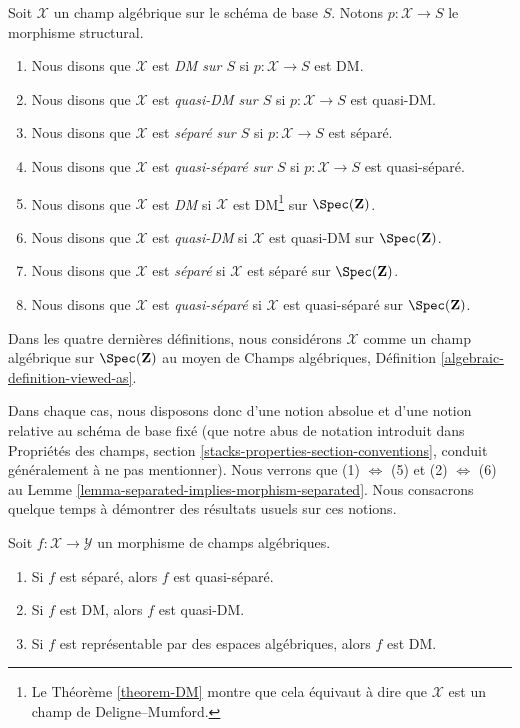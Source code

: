 \begin{definition}
\label{definition-absolute-separated}
Soit $\mathcal{X}$ un champ algébrique sur le schéma de base $S$. Notons
$p:\mathcal{X}\to S$ le morphisme structural.
\begin{enumerate}
\item Nous disons que $\mathcal{X}$ est {\it DM sur $S$} si
$p:\mathcal{X}\to S$ est DM.
\item Nous disons que $\mathcal{X}$ est {\it quasi-DM sur $S$} si
$p:\mathcal{X}\to S$ est quasi-DM.
\item Nous disons que $\mathcal{X}$ est {\it séparé sur $S$} si
$p:\mathcal{X}\to S$ est séparé.
\item Nous disons que $\mathcal{X}$ est {\it quasi-séparé sur $S$} si
$p:\mathcal{X}\to S$ est quasi-séparé.
\item Nous disons que $\mathcal{X}$ est {\it DM} si $\mathcal{X}$ est
DM\footnote{Le Théorème \ref{theorem-DM} montre que cela équivaut à dire que
$\mathcal{X}$ est un champ de Deligne--Mumford.} sur $\Spec(\mathbf{Z})$.
\item Nous disons que $\mathcal{X}$ est {\it quasi-DM} si $\mathcal{X}$ est
quasi-DM sur $\Spec(\mathbf{Z})$.
\item Nous disons que $\mathcal{X}$ est {\it séparé} si $\mathcal{X}$ est
séparé sur $\Spec(\mathbf{Z})$.
\item Nous disons que $\mathcal{X}$ est {\it quasi-séparé} si
$\mathcal{X}$ est quasi-séparé sur $\Spec(\mathbf{Z})$.
\end{enumerate}
Dans les quatre dernières définitions, nous considérons $\mathcal{X}$ comme un
champ algébrique sur $\Spec(\mathbf{Z})$ au moyen de Champs algébriques,
Définition \ref{algebraic-definition-viewed-as}.
\end{definition}

\noindent
Dans chaque cas, nous disposons donc d'une notion absolue et d'une notion
relative au schéma de base fixé (que notre abus de notation introduit dans
Propriétés des champs, section \ref{stacks-properties-section-conventions},
conduit généralement à ne pas mentionner). Nous verrons que
(1) $\Leftrightarrow$ (5) et (2) $\Leftrightarrow$ (6) au Lemme
\ref{lemma-separated-implies-morphism-separated}. Nous consacrons quelque
temps à démontrer des résultats usuels sur ces notions.

\begin{lemma}
\label{lemma-trivial-implications}
Soit $f : \mathcal{X} \to \mathcal{Y}$ un morphisme de champs algébriques.
\begin{enumerate}
\item Si $f$ est séparé, alors $f$ est quasi-séparé.
\item Si $f$ est DM, alors $f$ est quasi-DM.
\item Si $f$ est représentable par des espaces algébriques, alors $f$ est DM.
\end{enumerate}
\end{lemma}

